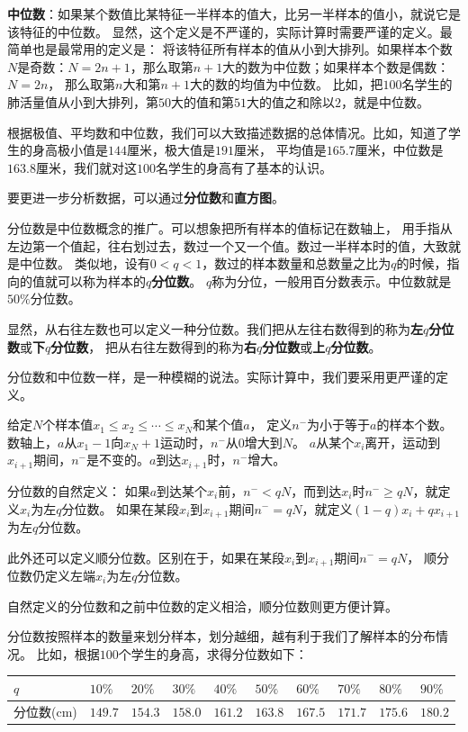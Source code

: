 \documentclass[12pt,UTF8]{ctexbook}
\begin{document}
\textbf{中位数}：如果某个数值比某特征一半样本的值大，比另一半样本的值小，就说它是该特征的中位数。
显然，这个定义是不严谨的，实际计算时需要严谨的定义。最简单也是最常用的定义是：
将该特征所有样本的值从小到大排列。如果样本个数$N$是奇数：$N = 2n + 1$，那么取第$n+1$大的数为中位数；如果样本个数是偶数：$N=2n$，
那么取第$n$大和第$n+1$大的数的均值为中位数。
比如，把$100$名学生的肺活量值从小到大排列，第$50$大的值和第$51$大的值之和除以$2$，就是中位数。

根据极值、平均数和中位数，我们可以大致描述数据的总体情况。比如，知道了学生的身高极小值是$144$厘米，极大值是$191$厘米，
平均值是$165.7$厘米，中位数是$163.8$厘米，我们就对这$100$名学生的身高有了基本的认识。

要更进一步分析数据，可以通过\textbf{分位数}和\textbf{直方图}。

分位数是中位数概念的推广。可以想象把所有样本的值标记在数轴上，
用手指从左边第一个值起，往右划过去，数过一个又一个值。数过一半样本时的值，大致就是中位数。
类似地，设有$0 < q < 1$，数过的样本数量和总数量之比为$q$的时候，指向的值就可以称为样本的$q$\textbf{分位数}。
$q$称为分位，一般用百分数表示。中位数就是$50\%$分位数。

显然，从右往左数也可以定义一种分位数。我们把从左往右数得到的称为\textbf{左}$q$\textbf{分位数}或\textbf{下}$q$\textbf{分位数}，
把从右往左数得到的称为\textbf{右}$q$\textbf{分位数}或\textbf{上}$q$\textbf{分位数}。

分位数和中位数一样，是一种模糊的说法。实际计算中，我们要采用更严谨的定义。

给定$N$个样本值$x_1 \leqslant x_2  \leqslant  \cdots  \leqslant x_N$和某个值$a$，
定义$n^{-}$为小于等于$a$的样本个数。
数轴上，$a$从$x_1 - 1$向$x_N + 1$运动时，$n^-$从$0$增大到$N$。
$a$从某个$x_i$离开，运动到$x_{i+1}$期间，$n^-$是不变的。$a$到达$x_{i+1}$时，$n^-$增大。

分位数的自然定义：
如果$a$到达某个$x_{i}$前，$n^- < qN$，而到达$x_{i}$时$n^- \geqslant qN$，就定义$x_{i}$为左$q$分位数。
如果在某段$x_i$到$x_{i+1}$期间$n^- = qN$，就定义$(1 - q)x_{i} + qx_{i+1}$为左$q$分位数。

此外还可以定义顺分位数。区别在于，如果在某段$x_i$到$x_{i+1}$期间$n^- = qN$，
顺分位数仍定义左端$x_i$为左$q$分位数。

自然定义的分位数和之前中位数的定义相洽，顺分位数则更方便计算。

分位数按照样本的数量来划分样本，划分越细，越有利于我们了解样本的分布情况。
比如，根据$100$个学生的身高，求得分位数如下：
\begin{center}
    \begin{tabular}{ | p{3.8em}<{\centering} | p{2em}<{\centering} | p{2em}<{\centering} | p{2em}<{\centering} | p{2em}<{\centering} | p{2em}<{\centering} | p{2em}<{\centering} | p{2em}<{\centering} | p{2em}<{\centering} | p{2em}<{\centering} | }
        \hline
            $q$   & $10\%$ & $20\%$ & $30\%$& $40\%$& $50\%$& $60\%$& $70\%$& $80\%$& $90\%$ \\ [0.5ex] 
        \hline
        {\scriptsize 分位数(cm)} & $149.7$ & $154.3$ & $158.0$ & $161.2$ & $163.8$ & $167.5$ & $171.7$ & $175.6$ & $180.2$ \\  
        \hline
    \end{tabular}
\end{center}
\end{document}
